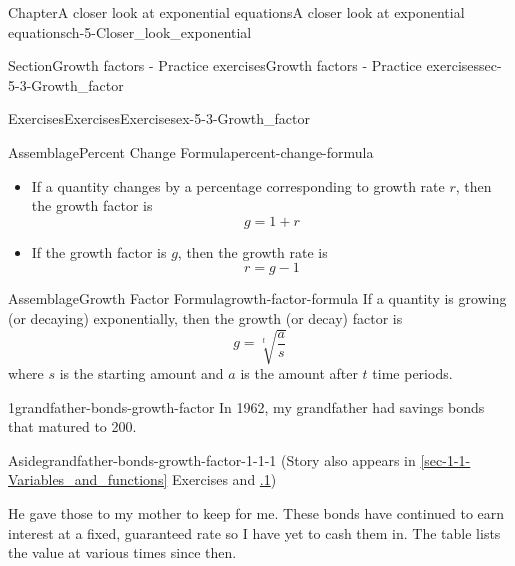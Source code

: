 \documentclass[twoside,11pt,]{book}
\newcommand{\xreffont}{\relax}
\numberwithin{equation}{section}
\begin{document}
\begin{chapterptx}{Chapter}{A closer look at exponential equations}{}{A closer look at exponential equations}{}{}{ch-5-Closer_look_exponential}
%
%
\typeout{************************************************}
\typeout{************************************************}
%
\begin{sectionptx}{Section}{Growth factors - Practice exercises}{}{Growth factors - Practice exercises}{}{}{sec-5-3-Growth_factor}
%
%
\typeout{************************************************}
\typeout{************************************************}
%
\begin{exercises-subsection-numberless}{Exercises}{Exercises}{}{Exercises}{}{}{ex-5-3-Growth_factor}
\begin{assemblage}{Assemblage}{Percent Change Formula}{percent-change-formula}%
%
\begin{itemize}[label=\textbullet]
\item{}If a quantity changes by a percentage corresponding to growth rate \(r\), then the growth factor is%
\begin{equation*}
\displaystyle g=1+r
\end{equation*}
%
\item{}If the growth factor is \(g\), then the growth rate is%
\begin{equation*}
r = g-1
\end{equation*}
%
\end{itemize}
%
\end{assemblage}
 \begin{assemblage}{Assemblage}{Growth Factor Formula}{growth-factor-formula}%
If a quantity is growing (or decaying) exponentially, then the growth (or decay) factor is%
\begin{equation*}
\displaystyle g = \sqrt[t]{\frac{a}{s}}
\end{equation*}
where \(s\) is the starting amount and \(a\) is the amount after \(t\) time periods.%
\end{assemblage}
\clearpage
\begin{divisionexercise}{1}{}{}{grandfather-bonds-growth-factor}%
In 1962, my grandfather had savings bonds that matured to \textdollar{}200. \begin{aside}{Aside}{}{grandfather-bonds-growth-factor-1-1-1}%
(Story also appears in \hyperref[sec-1-1-Variables_and_functions]{{\xreffont\ref{sec-1-1-Variables_and_functions}}} Exercises and \hyperlink{grandfather-bonds-growth-factor}{{\xreffont 5.3.1}})%
\end{aside}
 He gave those to my mother to keep for me. These bonds have continued to earn interest at a fixed, guaranteed rate so I have yet to cash them in. The table lists the value at various times since then.%

\end{divisionexercise}
\end{exercises-subsection-numberless}
\end{sectionptx}
\end{chapterptx}
\end{document}
